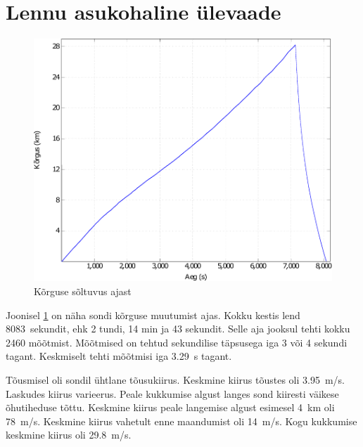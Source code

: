 \documentclass{trkut}%
\begin{document}
\section{Lennu asukohaline ülevaade}

\begin{figure}[h]
	\includegraphics[width=1\textwidth]{PicGra/kõraeg.pdf}
	\caption{Kõrguse sõltuvus ajast}
	\label{kõraeg}
\end{figure}

Joonisel \ref{kõraeg} on näha sondi kõrguse muutumist ajas. Kokku kestis lend \SI{8083}{sekundit}, ehk 2 tundi, 14 min ja 43 sekundit. Selle aja jooksul tehti kokku 2460 mõõtmist. Mõõtmised on tehtud sekundilise täpsusega iga 3 või 4 sekundi tagant. Keskmiselt tehti mõõtmisi iga \SI{3.29}{s} tagant.

Tõusmisel oli sondil ühtlane tõusukiirus. Keskmine kiirus tõustes oli \SI{3.95}{m/s}. Laskudes kiirus varieerus. Peale kukkumise algust langes sond kiiresti väikese õhutiheduse tõttu. Keskmine kiirus peale langemise algust esimesel \SI{4}{km} oli \SI{78}{m/s}. Keskmine kiirus vahetult enne maandumist oli \SI{14}{m/s}. Kogu kukkumise keskmine kiirus oli \SI{29.8}{m/s}.
\end{document}
